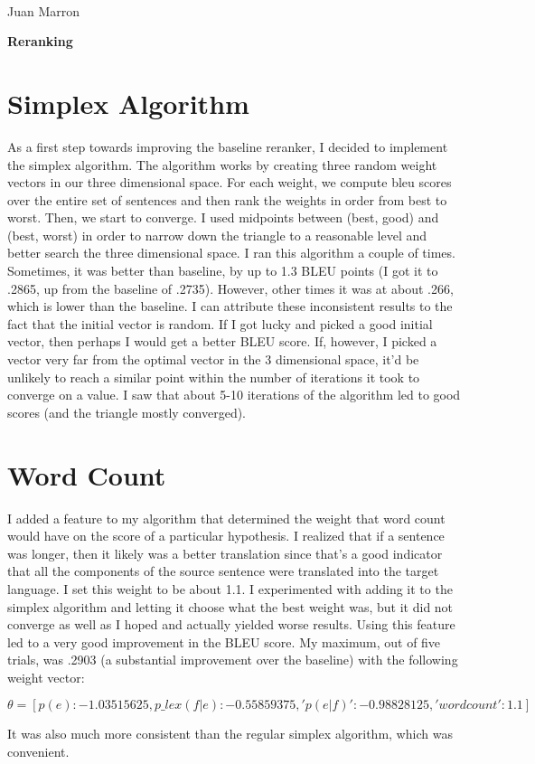 \documentclass[11pt]{article}
\begin{document}
\\
Juan Marron \\

\begin{center}
\large{\bf Reranking }
\end{center}

\section{Simplex Algorithm}
As a first step towards improving the baseline reranker, I decided to implement the simplex algorithm. The algorithm works by creating three random weight vectors in our three dimensional space. For each weight, we compute bleu scores over the entire set of sentences and then rank the weights in order from best to worst. Then, we start to converge. I used midpoints between (best, good) and (best, worst) in order to narrow down the triangle to a reasonable level and better search the three dimensional space. I ran this algorithm a couple of times. Sometimes, it was better than baseline, by up to 1.3 BLEU points (I got it to .2865, up from the baseline of .2735). However, other times it was at about .266, which is lower than the baseline. I can attribute these inconsistent results to the fact that the initial vector is random. If I got lucky and picked a good initial vector, then perhaps I would get a better BLEU score. If, however, I picked a vector very far from the optimal vector in the 3 dimensional space, it'd be unlikely to reach a similar point within the number of iterations it took to converge on a value. I saw that about 5-10 iterations of the algorithm led to good scores (and the triangle mostly converged).

\section{Word Count}
I added a feature to my algorithm that determined the weight that word count would have on the score of a particular hypothesis. I realized that if a sentence was longer, then it likely was a better translation since that's a good indicator that all the components of the source sentence were translated into the target language. I set this weight to be about 1.1. I experimented with adding it to the simplex algorithm and letting it choose what the best weight was, but it did not converge as well as I hoped and actually yielded worse results. Using this feature led to a very good improvement in the BLEU score. My maximum, out of five trials, was .2903 (a substantial improvement over the baseline) with the following weight vector:
\begin{center}
$\theta = [p(e): -1.03515625, p\_lex(f|e): -0.55859375, 'p(e|f)': -0.98828125, 'wordcount': 1.1]$
\end{center}
It was also much more consistent than the regular simplex algorithm, which was convenient. 
\end{document}
